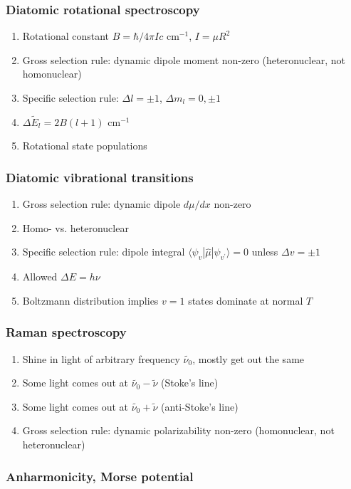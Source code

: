 \documentclass[11pt]{article}
\begin{document}
\subsubsection{Diatomic rotational spectroscopy}
\label{sec:org6f03187}
\begin{enumerate}
\item Rotational constant \(B = \hbar/4\pi I c\) cm\(^{-1}\), \(I=\mu R^2\)
\item Gross selection rule: dynamic dipole moment non-zero (heteronuclear, not homonuclear)
\item Specific selection rule: \(\Delta l=\pm 1\), \(\Delta m_l=0, \pm1\)
\item \(\Delta \tilde E_l  = 2B(l+1)\) cm\(^{-1}\)
\item Rotational state populations
\end{enumerate}
\subsubsection{Diatomic vibrational transitions}
\label{sec:org21d3221}
\begin{enumerate}
\item Gross selection rule: dynamic dipole \(d\mu/dx\) non-zero
\item Homo- vs. heteronuclear
\item Specific selection rule: dipole integral \(\langle \psi_v|\hat\mu|\psi_{v^\prime} \rangle =0\)
unless \(\Delta v = \pm 1\)
\item Allowed \(\Delta E = h\nu\)
\item Boltzmann distribution implies \(v=1\) states dominate at normal \(T\)
\end{enumerate}
\subsubsection{Raman spectroscopy}
\label{sec:org8c5b17c}
\begin{enumerate}
\item Shine in light of arbitrary frequency \(\tilde{\nu_0}\), mostly get out the same
\item Some light comes out at \(\tilde{\nu_0}-\tilde{\nu}\) (Stoke's line)
\item Some light comes out at \(\tilde{\nu_0}+\tilde{\nu}\) (anti-Stoke's line)
\item Gross selection rule: dynamic polarizability non-zero (homonuclear, not heteronuclear)
\end{enumerate}
\subsubsection{Anharmonicity, Morse potential}
\label{sec:orge53ffdb}
\end{document}
